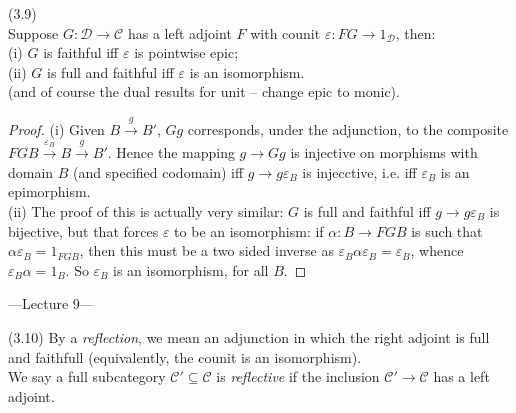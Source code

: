 \documentclass[a4paper]{article}
\begin{document}
\begin{lemma} (3.9)\\
    Suppose $G:\mathcal{D} \to \mathcal{C}$ has a left adjoint $F$ with counit $\varepsilon:FG \to 1_{\mathcal{D}}$, then:\\
    (i) $G$ is faithful iff $\varepsilon$ is pointwise epic;\\
    (ii) $G$ is full and faithful iff $\varepsilon$ is an isomorphism.\\
    (and of course the dual results for unit -- change epic to monic).\\
    \begin{proof}
        (i) Given $B \xrightarrow{g} B'$, $Gg$ corresponds, under the adjunction, to the composite $FGB \xrightarrow{\varepsilon_B} B \xrightarrow{g} B'$. Hence the mapping $g \to Gg$ is injective on morphisms with domain $B$ (and specified codomain) iff $g \to g\varepsilon_B$ is injecctive, i.e. iff $\varepsilon_B$ is an epimorphism.\\
        (ii) The proof of this is actually very similar: $G$ is full and faithful iff $g \to g\varepsilon_B$ is bijective, but that forces $\varepsilon$ to be an isomorphism: if $\alpha:B \to FGB$ is such that $\alpha\varepsilon_B = 1_{FGB}$, then this must be a two sided inverse as $\varepsilon_B \alpha \varepsilon_B = \varepsilon_B$, whence $\varepsilon_B \alpha = 1_B$. So $\varepsilon_B$ is an isomorphism, for all $B$.
    \end{proof}
\end{lemma}

---Lecture 9---

\begin{defi} (3.10)
    By a \emph{reflection}, we mean an adjunction in which the right adjoint is full and faithfull (equivalently, the counit is an isomorphism).\\
    We say a full subcategory $\mathcal{C}' \subseteq \mathcal{C}$ is \emph{reflective} if the inclusion $\mathcal{C}'\to\mathcal{C}$ has a left adjoint.
\end{defi}
\end{document}
